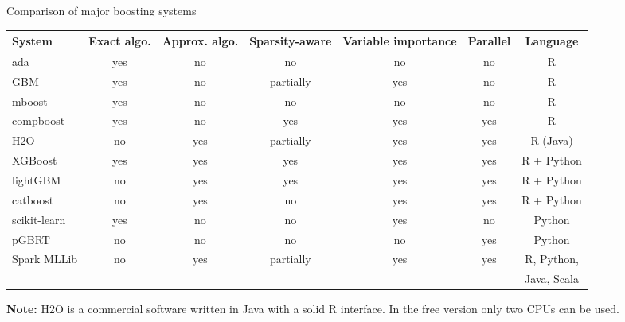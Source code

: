 \begin{vbframe}{Comparison of major boosting systems}

\begin{tiny}
\begin{table}[]
\centering
\begin{tabular}{l|c|c|c|c|c|c}
System       & Exact algo. & Approx. algo. & Sparsity-aware & Variable importance & Parallel & Language   \\
\hline
ada          & yes         & no            & no             & no                  & no       & R          \\
GBM          & yes         & no            & partially      & yes                 & no       & R          \\
mboost       & yes         & no            & no             & no                  & no       & R          \\
compboost    & yes         & no            & yes            & yes                 & yes      & R          \\
H2O          & no          & yes           & partially      & yes                 & yes      & R (Java)   \\
XGBoost      & yes         & yes           & yes            & yes                 & yes      & R + Python \\
lightGBM     & no          & yes           & yes            & yes                 & yes      & R + Python \\
catboost     & no          & yes           & no             & yes                 & yes      & R + Python \\
scikit-learn & yes         & no            & no             & yes                 & no       & Python     \\
pGBRT        & no          & no            & no             & no                  & yes      & Python     \\
Spark MLLib  & no          & yes           & partially      & yes                 & yes      & R, Python, \\
             &             &               &                &                     &          & Java, Scala\\

\end{tabular}
\label{my-label}
\end{table}
\end{tiny}

\lz

\textbf{Note:} H2O is a commercial software written in Java with a solid R interface.
In the free version only two CPUs can be used.


\end{vbframe}
